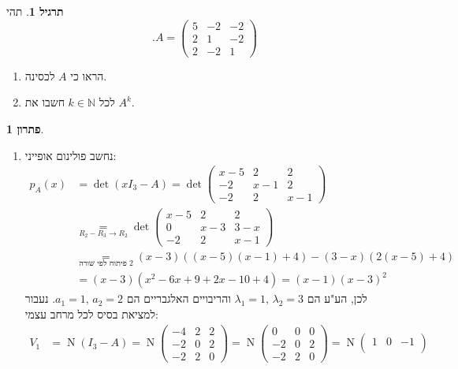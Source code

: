 \documentclass[12pt]{report}
\theoremstyle{plain}
\theoremstyle{definition}
\newtheorem{exercise}{תרגיל}[chapter]
\newtheorem*{solution}{פתרון}
\newcommand{\N}{\mathbb{N}}
\newcommand{\0}{\mathbf{0}}
\DeclareMathOperator{\Null}{N}
\begin{document}
\begin{exercise}\label{exer:matrix-power}
תהי
$$
.A=\begin{pmatrix}
5 & -2 & -2\\
2 & 1 & -2\\
2 & -2 & 1
\end{pmatrix}
$$
\begin{enumerate}[label=\alph*.]
\item 
הראו כי
$A$
לכסינה.


\item 
לכל
$k\in\N$
חשבו את 
$A^k$.


\end{enumerate}
\end{exercise}

\begin{solution}\
\begin{enumerate}[label=\alph*.]
\item 
נחשב פולינום אופייני:
$$
\begin{aligned}
p_A(x)&=\det(xI_3-A)=\det\begin{pmatrix}
x-5 & 2 & 2\\
-2 & x-1 & 2\\
-2 & 2 & x-1
\end{pmatrix} \\
&\underset{R_2-R_3\to R_2}=\det\begin{pmatrix}
x-5 & 2 & 2\\
0 & x-3 & 3-x\\
-2 & 2 & x-1
\end{pmatrix} \\
&\underset{\text{פיתוח לפי שורה $2$}}=(x-3)\left((x-5)(x-1)+4\right)-(3-x)\left(2(x-5)+4\right) \\
&=(x-3)(x^2-6x+9+2x-10+4)=(x-1)(x-3)^2
\end{aligned}
$$
לכן, הע"ע הם 
$\lambda_1=1,\,\lambda_2=3$
והריבויים האלגבריים הם
$a_1=1,\,a_2=2$.
נעבור למציאת בסיס לכל מרחב עצמי:
$$
\begin{aligned}
V_1&=\Null(I_3-A)=\Null\begin{pmatrix}
-4 & 2 & 2\\
-2 & 0 & 2\\
-2 & 2 & 0
\end{pmatrix}=\Null\begin{pmatrix}
0 & 0 & 0\\
-2 & 0 & 2\\
-2 & 2 & 0
\end{pmatrix}=\Null\begin{pmatrix}
1 & 0 & -1\\

\end{pmatrix}
\end{aligned}$$
\end{enumerate}
\end{solution}
\end{document}
